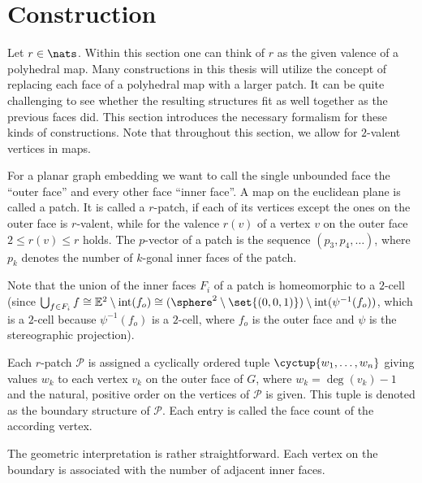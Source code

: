 \section{Construction}\label{sec:construction}

Let $r \in \nats$. Within this section one can think of $r$ as the given valence of a polyhedral map. Many constructions in this thesis will utilize the concept of replacing each face of a polyhedral map with a larger patch. It can be quite challenging to see whether the resulting structures fit as well together as the previous faces did. This section introduces the necessary formalism for these kinds of constructions. Note that throughout this section, we allow for $2$-valent vertices in maps.

\begin{definition}[Patch] For a planar graph embedding we want to call the single unbounded face the ``outer face'' and every other face ``inner face''. A map on the euclidean plane is called a patch. It is called a $r$-patch, if each of its vertices except the ones on the outer face is $r$-valent, while for the valence $r(v)$ of a vertex $v$ on the outer face $2 \leq r(v) \leq r$ holds. The $p$-vector of a patch is the sequence $(p_3, p_4, \dots)$, where $p_k$ denotes the number of $k$-gonal inner faces of the patch.
\end{definition}

Note that the union of the inner faces $F_{i}$ of a patch is homeomorphic to a $2$-cell (since $\bigcup_{f \in F_{i}} f \cong \mathbb{E}^2 \setminus \operatorname{int}(f_{o}) \cong (\sphere^2 \setminus \set{(0, 0, 1)}) \setminus \operatorname{int}(\psi^{-1}(f_{o}))$, which is a $2$-cell because $\psi^{-1}(f_{o})$ is a $2$-cell, where $f_{o}$ is the outer face and $\psi$ is the stereographic projection).

\begin{definition} Each $r$-patch $\mathcal{P}$ is assigned a cyclically ordered tuple $\cyctup{w_1, \dots, w_n}$ giving values $w_k$ to each vertex $v_k$ on the outer face of $G$, where $w_k = \deg(v_k) - 1$ and the natural, positive order on the vertices of $\mathcal{P}$ is given. This tuple is denoted as the boundary structure of $\mathcal{P}$. Each entry is called the face count of the according vertex.
\end{definition}

The geometric interpretation is rather straightforward. Each vertex on the boundary is associated with the number of adjacent inner faces.

